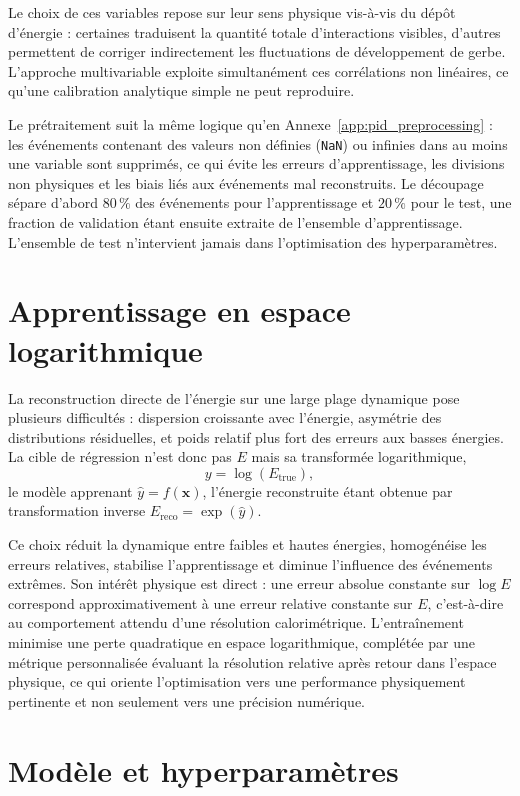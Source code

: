 Le choix de ces variables repose sur leur sens physique vis-à-vis du dépôt d'énergie : certaines traduisent la quantité totale d'interactions visibles, d'autres permettent de corriger indirectement les fluctuations de développement de gerbe. L'approche multivariable exploite simultanément ces corrélations non linéaires, ce qu'une calibration analytique simple ne peut reproduire.

Le prétraitement suit la même logique qu'en Annexe~\ref{app:pid_preprocessing} : les événements contenant des valeurs non définies (\texttt{NaN}) ou infinies dans au moins une variable sont supprimés, ce qui évite les erreurs d'apprentissage, les divisions non physiques et les biais liés aux événements mal reconstruits. Le découpage sépare d'abord \(80\,\%\) des événements pour l'apprentissage et \(20\,\%\) pour le test, une fraction de validation étant ensuite extraite de l'ensemble d'apprentissage. L'ensemble de test n'intervient jamais dans l'optimisation des hyperparamètres.

\section{Apprentissage en espace logarithmique}

La reconstruction directe de l'énergie sur une large plage dynamique pose plusieurs difficultés : dispersion croissante avec l'énergie, asymétrie des distributions résiduelles, et poids relatif plus fort des erreurs aux basses énergies. La cible de régression n'est donc pas \(E\) mais sa transformée logarithmique,
\[
y = \log(E_{\mathrm{true}}),
\]
le modèle apprenant \(\hat{y} = f(\mathbf{x})\), l'énergie reconstruite étant obtenue par transformation inverse \(E_{\mathrm{reco}} = \exp(\hat{y})\).

Ce choix réduit la dynamique entre faibles et hautes énergies, homogénéise les erreurs relatives, stabilise l'apprentissage et diminue l'influence des événements extrêmes. Son intérêt physique est direct : une erreur absolue constante sur \(\log E\) correspond approximativement à une erreur relative constante sur \(E\), c'est-à-dire au comportement attendu d'une résolution calorimétrique. L'entraînement minimise une perte quadratique en espace logarithmique, complétée par une métrique personnalisée évaluant la résolution relative après retour dans l'espace physique, ce qui oriente l'optimisation vers une performance physiquement pertinente et non seulement vers une précision numérique.

\section{Modèle et hyperparamètres}

